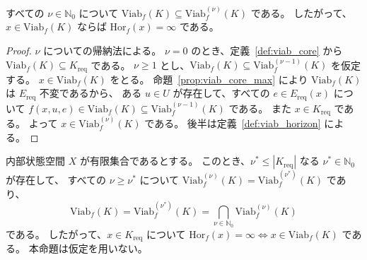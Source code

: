 \begin{proposition}
\label{prop:viab_stage_core}
すべての $\nu\in\mathbb{N}_0$ について
$\mathrm{Viab}_f(K)\subseteq\mathrm{Viab}_f^{(\nu)}(K)$ である。
したがって、$x\in\mathrm{Viab}_f(K)$ ならば $\mathrm{Hor}_f(x)=\infty$ である。
\end{proposition}

\begin{proof}
$\nu$ についての帰納法による。
$\nu=0$ のとき、定義~\ref{def:viab_core} から $\mathrm{Viab}_f(K)\subseteq K_{\mathrm{req}}$ である。
$\nu\ge1$ とし、$\mathrm{Viab}_f(K)\subseteq\mathrm{Viab}_f^{(\nu-1)}(K)$ を仮定する。
$x\in\mathrm{Viab}_f(K)$ をとる。
命題~\ref{prop:viab_core_max} により $\mathrm{Viab}_f(K)$ は $E_{\mathrm{req}}$ 不変であるから、
ある $u\in U$ が存在して、すべての $e\in E_{\mathrm{req}}(x)$ について
$f(x,u,e)\in\mathrm{Viab}_f(K)\subseteq\mathrm{Viab}_f^{(\nu-1)}(K)$ である。
また $x\in K_{\mathrm{req}}$ である。
よって $x\in\mathrm{Viab}_f^{(\nu)}(K)$ である。
後半は定義~\ref{def:viab_horizon} による。
\end{proof}

\begin{proposition}[有限状態空間における可行性核と有限段頑健可行集合]
\label{prop:viab_stage_finite}
内部状態空間 $X$ が有限集合であるとする。
このとき、$\nu^{\ast}\le|K_{\mathrm{req}}|$ なる $\nu^{\ast}\in\mathbb{N}_0$ が存在して、
すべての $\nu\ge\nu^{\ast}$ について
$\mathrm{Viab}_f^{(\nu)}(K)=\mathrm{Viab}_f^{(\nu^{\ast})}(K)$ であり、
\[
  \mathrm{Viab}_f(K)
  =
  \mathrm{Viab}_f^{(\nu^{\ast})}(K)
  =
  \bigcap_{\nu\in\mathbb{N}_0}\mathrm{Viab}_f^{(\nu)}(K)
\]
である。
したがって、$x\in K_{\mathrm{req}}$ について
$\mathrm{Hor}_f(x)=\infty\iff x\in\mathrm{Viab}_f(K)$ である。
本命題は仮定を用いない。
\end{proposition}

